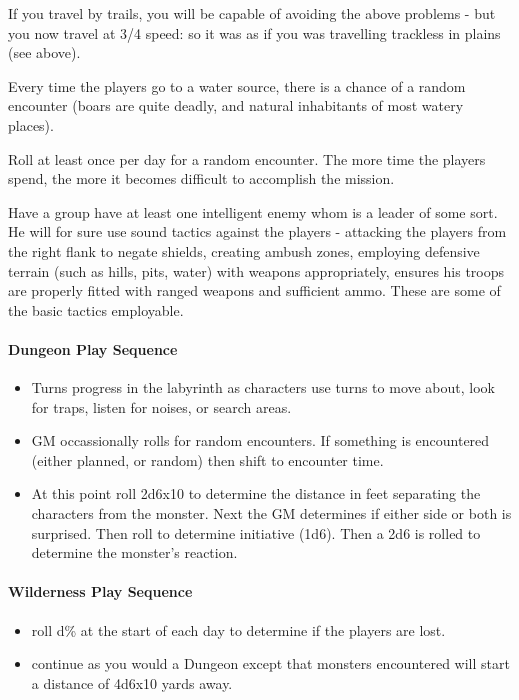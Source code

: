 \begin{multicols}{2}
If you travel by trails, you will be capable of avoiding the above problems - but you now travel at 3/4 speed: so it was as if you was travelling trackless in plains (see above).

Every time the players go to a water source, there is a chance of a random encounter (boars are quite deadly, and natural inhabitants of most watery places).

Roll at least once per day for a random encounter. The more time the players spend, the more it becomes difficult to accomplish the mission.

Have a group have at least one intelligent enemy whom is a leader of some sort. He will for sure use sound tactics against the players - attacking the players from the right flank to negate shields, creating ambush zones, employing defensive terrain (such as hills, pits, water) with weapons appropriately, ensures his troops are properly fitted with ranged weapons and sufficient ammo. These are some of the basic tactics employable.

\end{multicols}

\paragraph{Dungeon Play Sequence}
\begin{itemize}
    \item Turns progress in the labyrinth as characters use turns to move about, look for traps, listen for noises, or search areas.
    \item GM occassionally rolls for random encounters. If something is encountered (either planned, or random) then shift to encounter time.
    \item At this point roll 2d6x10 to determine the distance in feet separating the characters from the monster. Next the GM determines if either side or both is surprised. Then roll to determine initiative (1d6). Then a 2d6 is rolled to determine the monster's reaction.
\end{itemize}


\paragraph{Wilderness Play Sequence}
\begin{itemize}
    \item roll d\% at the start of each day to determine if the players are lost.
    \item continue as you would a Dungeon except that monsters encountered will start a distance of 4d6x10 yards away. 
\end{itemize}


